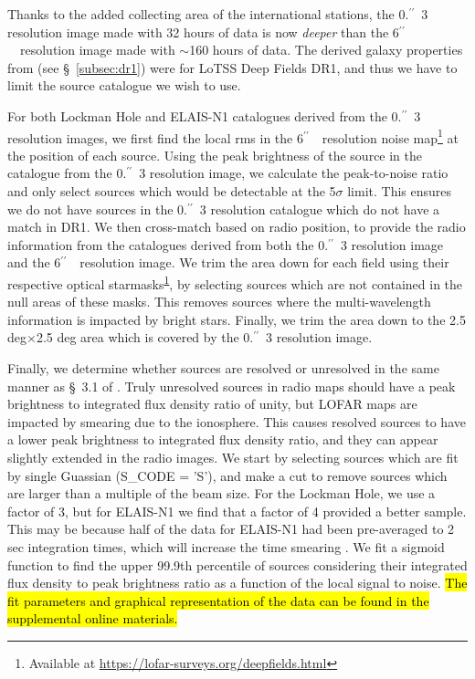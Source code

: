\documentclass[usenatbib,fleqn,letters]{mnras}
\newcommand{\sarc}{$^{\prime\prime}\!\!$}
\begin{document}
Thanks to the added collecting area of the international stations, the 0.\sarc\ 3 resolution image made with 32 hours of data is now \textit{deeper} than the 6\sarc\ \ resolution image made with $\sim$160 hours of data. The derived galaxy properties from  (see \S~\ref{subsec:dr1}) were for LoTSS Deep Fields DR1, and thus we have to limit the source catalogue we wish to use. 

For both Lockman Hole and ELAIS-N1 catalogues derived from the 0.\sarc\ 3 resolution images, we first find the local rms in the 6\sarc\ \ resolution noise map\footnote{\label{dr1}Available at \href{https://lofar-surveys.org/deepfields.html}{https://lofar-surveys.org/deepfields.html}} at the position of each source. Using the peak brightness of the source in the catalogue from the 0.\sarc\ 3 resolution image, we calculate the peak-to-noise ratio and only select sources which would be detectable at the 5$\sigma$ limit. This ensures we do not have sources in the 0.\sarc\ 3 resolution catalogue which do not have a match in DR1. We then cross-match based on radio position, to provide the radio information from the catalogues derived from both the 0.\sarc\ 3 resolution image and the 6\sarc\ \ resolution image. We trim the area down for each field using their respective optical starmasks\textsuperscript{\ref{dr1}}, by selecting sources which are not contained in the null areas of these masks. This removes sources where the multi-wavelength information is impacted by bright stars. Finally, we trim the area down to the 2.5 deg$\times$2.5 deg area which is covered by the 0.\sarc\ 3 resolution image. 

Finally, we determine whether sources are resolved or unresolved in the same manner as \S~3.1 of \cite{shimwell_lofar_2019,shimwell_lofar_2022}. Truly unresolved sources in radio maps should have a peak brightness to integrated flux density ratio of unity, but LOFAR maps are impacted by smearing due to the ionosphere. This causes resolved sources to have a lower peak brightness to integrated flux density ratio, and they can appear slightly extended in the radio images. We start by selecting sources which are fit by single Guassian ({\ttfamily S\_CODE = 'S'}), and make a cut to remove sources which are larger than a multiple of the beam size. For the Lockman Hole, we use a factor of 3, but for ELAIS-N1 we find that a factor of 4 provided a better sample. This may be because half of the data for ELAIS-N1 had been pre-averaged to 2 sec integration times, which will increase the time smearing \citep[see \S~2 in][]{de_jong_into_2024}. We fit a sigmoid function to find the upper 99.9th percentile of sources considering their integrated flux density to peak brightness ratio as a function of the local signal to noise. \hl{The fit parameters and graphical representation of the data can be found in the supplemental online materials.}
\end{document}
